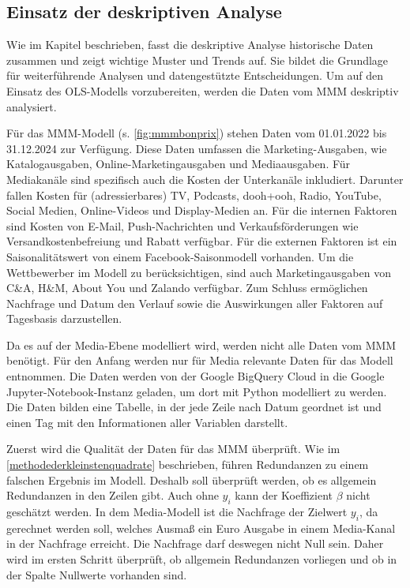 \subsection{Einsatz der deskriptiven Analyse}
\label{EinsatzDerDeskriptivenAnalyse}
Wie im Kapitel  beschrieben, fasst die deskriptive Analyse historische Daten zusammen und zeigt wichtige Muster und Trends auf. Sie bildet die Grundlage für weiterführende Analysen und datengestützte Entscheidungen. Um auf den Einsatz des \ac{OLS}-Modells vorzubereiten, werden die Daten vom \ac{MMM} deskriptiv analysiert. \par
Für das \ac{MMM}-Modell (s. \autoref{fig:mmmbonprix}) stehen Daten vom 01.01.2022 bis 31.12.2024 zur Verfügung. Diese Daten umfassen die Marketing-Ausgaben, wie Katalogausgaben, Online-Marketingausgaben und Mediaausgaben. Für Mediakanäle sind spezifisch auch die Kosten der Unterkanäle inkludiert. Darunter fallen Kosten für (adressierbares) TV, Podcasts, \ac{dooh}+\ac{ooh}, Radio, YouTube, Social Medien, Online-Videos und Display-Medien an. Für die internen Faktoren sind Kosten von E-Mail, Push-Nachrichten und Verkaufsförderungen wie Versandkostenbefreiung und Rabatt verfügbar. Für die externen Faktoren ist ein Saisonalitätswert von einem Facebook-Saisonmodell vorhanden. Um die Wettbewerber im Modell zu berücksichtigen, sind auch Marketingausgaben von C\&A, H\&M, About You und Zalando verfügbar. Zum Schluss ermöglichen Nachfrage und Datum den Verlauf sowie die Auswirkungen aller Faktoren auf Tagesbasis darzustellen. \par
Da es auf der Media-Ebene modelliert wird, werden nicht alle Daten vom \ac{MMM} benötigt. Für den Anfang werden nur für Media relevante Daten für das Modell entnommen. Die Daten werden von der Google BigQuery Cloud in die Google Jupyter-Notebook-Instanz geladen, um dort mit Python modelliert zu werden. Die Daten bilden eine Tabelle, in der jede Zeile nach Datum geordnet ist und einen Tag mit den Informationen aller Variablen darstellt. \par 
Zuerst wird die Qualität der Daten für das \ac{MMM} überprüft. Wie im \autoref{methodederkleinstenquadrate} beschrieben, führen Redundanzen zu einem falschen Ergebnis im Modell. Deshalb soll überprüft werden, ob es allgemein Redundanzen in den Zeilen gibt. Auch ohne \(y_i\) kann der Koeffizient $\beta$ nicht geschätzt werden. In dem Media-Modell ist die Nachfrage der Zielwert \(y_i\), da gerechnet werden soll, welches Ausmaß ein Euro Ausgabe in einem Media-Kanal in der Nachfrage erreicht. Die Nachfrage darf deswegen nicht Null sein. Daher wird im ersten Schritt überprüft, ob allgemein Redundanzen vorliegen und ob in der Spalte  Nullwerte vorhanden sind.\par
